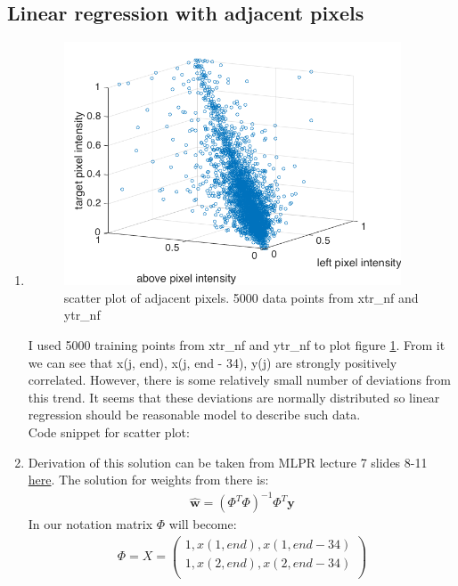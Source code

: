\documentclass{article}
\newcommand{\vect}[1]{\boldsymbol{#1}} %
\begin{document}
		\subsection{Linear regression with adjacent pixels}
			\begin{enumerate}[label=(\alph*)]
				\item
				 	\begin{figure}[t]
				 		\centering
				 		\includegraphics[width=10cm]{images/p1-2-a_closest_pixels}
				 		\caption{scatter plot of adjacent pixels. 5000 data points from xtr\_nf and ytr\_nf}
				 		\label{fig:p1-2-a_closest_pixels}
				 	\end{figure}
					I used 5000 training points from xtr\_nf and ytr\_nf to plot figure \ref{fig:p1-2-a_closest_pixels}. From it we can see that x(j, end), x(j, end - 34), y(j) are strongly positively correlated. However, there is some relatively small number of deviations from this trend. It seems that these deviations are normally distributed so linear regression should be reasonable model to describe such data.\\
					Code snippet for scatter plot:
					 
				\item
					Derivation of this solution can be taken from MLPR lecture 7 slides 8-11 \href{http://www.inf.ed.ac.uk/teaching/courses/mlpr/2015/slides/07_regression.pdf}{here}. The solution for weights from there is:
					\begin{gather*}
					\hat{\vect{w}} = (\Phi^T \Phi)^{-1} \Phi^T \vect{y}
					\end{gather*}
					In our notation matrix $\Phi$ will become:
					\begin{gather*}
						\Phi = X = 
						\begin{pmatrix}
						1, x(1, end), x(1, end - 34)\\
						1, x(2, end), x(2, end - 34)\\

\end{pmatrix}
\end{gather*}
\end{enumerate}
\end{document}
